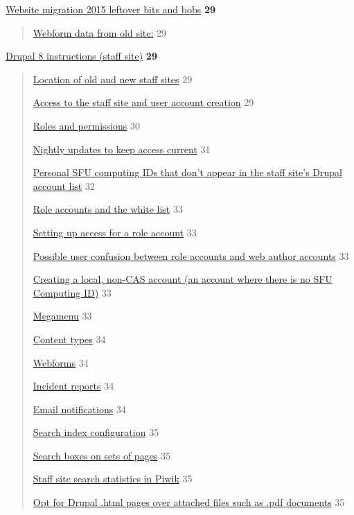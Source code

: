 \documentclass[
  openany]{book}
\begin{document}
\protect\hyperlink{website-migration-2015-leftover-bits-and-bobs}{Website migration 2015 leftover bits and
bobs} \textbf{29}

\begin{quote}
\protect\hyperlink{webform-data-from-old-site}{Webform data from old site:} 29
\end{quote}

\protect\hyperlink{drupal-8-instructions-staff-site}{Drupal 8 instructions (staff site)}
\textbf{29}

\begin{quote}
\protect\hyperlink{location-of-old-and-new-staff-sites}{Location of old and new staff
sites} 29

\protect\hyperlink{access-to-the-staff-site-and-user-account-creation}{Access to the staff site and user account
creation} 29

\protect\hyperlink{roles-and-permissions}{Roles and permissions} 30

\protect\hyperlink{nightly-updates-to-keep-access-current}{Nightly updates to keep access
current} 31

\protect\hyperlink{personal-sfu-computing-ids-that-dont-appear-in-the-staff-sites-drupal-account-list}{Personal SFU computing IDs that don't appear in the staff site's
Drupal account
list}
32

\protect\hyperlink{role-accounts-and-the-white-list}{Role accounts and the white list}
33

\protect\hyperlink{setting-up-access-for-a-role-account}{Setting up access for a role
account} 33

\protect\hyperlink{possible-user-confusion-between-role-accounts-and-web-author-accounts}{Possible user confusion between role accounts and web author
accounts}
33

\protect\hyperlink{creating-a-local-non-cas-account-an-account-where-there-is-no-sfu-computing-id}{Creating a local, non-CAS account (an account where there is no SFU
Computing
ID)}
33

\protect\hyperlink{megamenu}{Megamenu} 33

\protect\hyperlink{content-types}{Content types} 34

\protect\hyperlink{webforms}{Webforms} 34

\protect\hyperlink{incident-reports}{Incident reports} 34

\protect\hyperlink{email-notifications}{Email notifications} 34

\protect\hyperlink{search-index-configuration}{Search index configuration} 35

\protect\hyperlink{search-boxes-on-sets-of-pages}{Search boxes on sets of pages} 35

\protect\hyperlink{staff-site-search-statistics-in-piwik}{Staff site search statistics in
Piwik} 35

\protect\hyperlink{opt-for-drupal-.html-pages-over-attached-files-such-as-.pdf-documents}{Opt for Drupal .html pages over attached files such as .pdf
documents}
35
\end{quote}
\end{document}

